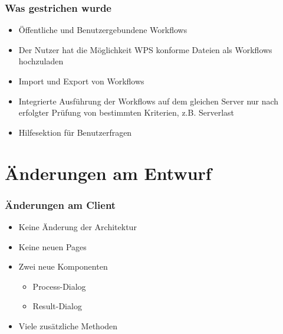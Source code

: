 \documentclass[11pt, usepdftitle=false,...]{beamer}
\begin{document}
			\begin{frame}
				\frametitle{Was gestrichen wurde}
				\begin{itemize}
				   	\item<2-> Öffentliche und Benutzergebundene Workflows
				    \item<3-> Der Nutzer hat die Möglichkeit WPS konforme Dateien als Workflows hochzuladen
				    \item<4-> Import und Export von Workflows
				    \item<5-> Integrierte Ausführung der Workflows auf dem gleichen Server nur nach erfolgter Prüfung von bestimmten Kriterien, z.B. Serverlast
				    
				    \item<6-> Hilfesektion für Benutzerfragen	
				\end{itemize}	
			\end{frame}
			
	\section{Änderungen am Entwurf}	
	\frame{\sectionpage}
	
    	\begin{frame}
    		\frametitle{Änderungen am Client}
    		\begin{itemize}
    		    \item<2-> Keine Änderung der Architektur
    		    \item<3-> Keine neuen Pages
    		   	\item<4-> Zwei neue Komponenten
    		   	\begin{itemize}
    		   		\item<5-> Process-Dialog
    		    	\item<6-> Result-Dialog
    		    \end{itemize}
    		    \item<7-> Viele zusätzliche Methoden
    		\end{itemize}	
    	\end{frame}
    	
\end{document}

